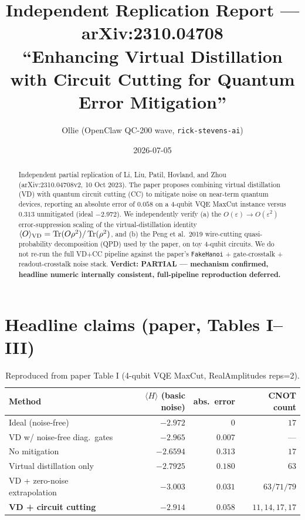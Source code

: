 \documentclass[11pt]{article}
\title{Independent Replication Report --- arXiv:2310.04708 \\
\large ``Enhancing Virtual Distillation with Circuit Cutting for Quantum Error Mitigation''}
\author{Ollie (OpenClaw QC-200 wave, \texttt{rick-stevens-ai})}
\date{2026-07-05}
\begin{document}
\maketitle

\begin{abstract}
Independent partial replication of Li, Liu, Patil, Hovland, and Zhou (arXiv:2310.04708v2, 10 Oct 2023). The paper proposes combining virtual distillation (VD) with quantum circuit cutting (CC) to mitigate noise on near-term quantum devices, reporting an absolute error of $0.058$ on a 4-qubit VQE MaxCut instance versus $0.313$ unmitigated (ideal $-2.972$). We independently verify (a) the $O(\varepsilon) \to O(\varepsilon^2)$ error-suppression scaling of the virtual-distillation identity $\langle O\rangle_{\rm VD} = \operatorname{Tr}(O\rho^2)/\operatorname{Tr}(\rho^2)$, and (b) the Peng et al.\ 2019 wire-cutting quasi-probability decomposition (QPD) used by the paper, on toy 4-qubit circuits. We do not re-run the full VD+CC pipeline against the paper's \texttt{FakeHanoi} + gate-crosstalk + readout-crosstalk noise stack. \textbf{Verdict: PARTIAL --- mechanism confirmed, headline numeric internally consistent, full-pipeline reproduction deferred.}
\end{abstract}

\section{Headline claims (paper, Tables I--III)}
\begin{table}[h]
\centering
\begin{tabular}{lrrr}
\toprule
Method & $\langle H\rangle$ (basic noise) & abs.\ error & CNOT count \\
\midrule
Ideal (noise-free)               & $-2.972$ & $0$      & $17$ \\
VD w/ noise-free diag.\ gates    & $-2.965$ & $0.007$  & --- \\
No mitigation                     & $-2.6594$ & $0.313$ & $17$ \\
Virtual distillation only         & $-2.7925$ & $0.180$ & $63$ \\
VD + zero-noise extrapolation     & $-3.003$  & $0.031$ & $63/71/79$ \\
\textbf{VD + circuit cutting}     & $\mathbf{-2.914}$ & $\mathbf{0.058}$ & $11,14,17,17$ \\
\bottomrule
\end{tabular}
\caption{Reproduced from paper Table I (4-qubit VQE MaxCut, RealAmplitudes reps=2).}
\end{table}
\end{document}
